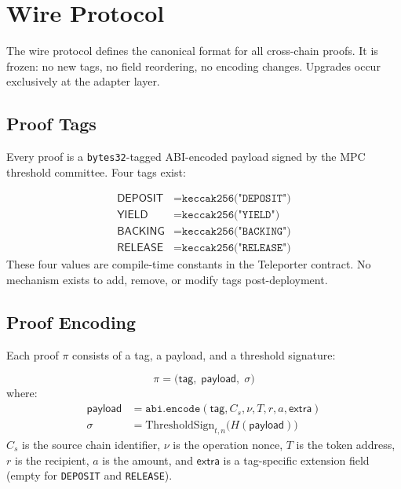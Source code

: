 \section{Wire Protocol}

\label{sec:wire}

The wire protocol defines the canonical format for all cross-chain proofs. It is frozen: no new tags, no field reordering, no encoding changes. Upgrades occur exclusively at the adapter layer.

\subsection{Proof Tags}

Every proof is a \texttt{bytes32}-tagged ABI-encoded payload signed by the MPC threshold committee. Four tags exist:

\begin{definition}
\label{def:tags}
\begin{align}
  \mathsf{DEPOSIT}  &= \texttt{keccak256("DEPOSIT")}  \label{eq:tag-deposit} \\
  \mathsf{YIELD}    &= \texttt{keccak256("YIELD")}    \label{eq:tag-yield} \\
  \mathsf{BACKING}  &= \texttt{keccak256("BACKING")}  \label{eq:tag-backing} \\
  \mathsf{RELEASE}  &= \texttt{keccak256("RELEASE")}  \label{eq:tag-release}
\end{align}
These four values are compile-time constants in the Teleporter contract. No mechanism exists to add, remove, or modify tags post-deployment.
\end{definition}

\subsection{Proof Encoding}

Each proof $\pi$ consists of a tag, a payload, and a threshold signature:

\begin{definition}
\label{def:proof}
\begin{equation}
  \pi = \bigl(\mathsf{tag},\; \mathsf{payload},\; \sigma\bigr)
\end{equation}
where:
\begin{align}
  \mathsf{payload} &= \texttt{abi.encode}(\mathsf{tag}, C_s, \nu, T, r, a, \mathsf{extra}) \\
  \sigma &= \mathrm{ThresholdSign}_{t,n}\bigl(H(\mathsf{payload})\bigr)
\end{align}
$C_s$ is the source chain identifier, $\nu$ is the operation nonce, $T$ is the token address, $r$ is the recipient, $a$ is the amount, and $\mathsf{extra}$ is a tag-specific extension field (empty for \texttt{DEPOSIT} and \texttt{RELEASE}).
\end{definition}

